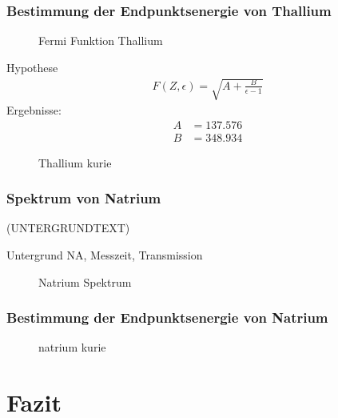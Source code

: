 \documentclass[11pt, a4paper]{article}
\numberwithin{equation}{section}
\begin{document}
\subsubsection{Bestimmung der Endpunktsenergie von Thallium}
\begin{figure}[h]
	\centering
	
	\caption{Fermi Funktion Thallium}
	\label{fig:fermi_tl}
\end{figure}

Hypothese \cite{fermi_function}
\begin{align*}
	F(Z, \epsilon) = \sqrt{A + \frac{B}{\epsilon - 1}}
\end{align*}
Ergebnisse:
\begin{align*}
	A &= \num{137.576} \\
	B &= \num{348.934}
\end{align*}

\begin{figure}[h]
	\centering
	
	\caption{Thallium kurie}
	\label{fig:thallium_kurie}
\end{figure}


\subsubsection{Spektrum von Natrium}
(UNTERGRUNDTEXT)
\begin{table}[h]
	\centering
	
	\caption{Untergrund NA, Messzeit, Transmission}
	\label{tab:untergrund_na}
\end{table}

\begin{figure}[h]
	\centering
	
	\caption{Natrium Spektrum}
	\label{fig:natrium_spectrum}
\end{figure}

\subsubsection{Bestimmung der Endpunktsenergie von Natrium}
\begin{figure}[h]
	\centering
	
	\caption{natrium kurie}
	\label{fig:natrium_kurie}
\end{figure}


\section{Fazit}
\end{document}
